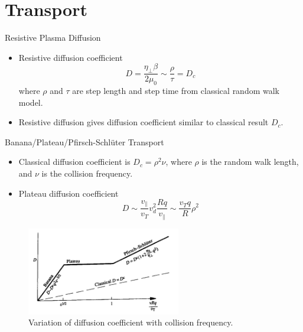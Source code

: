 \section{Transport}
\begin{frame} {Resistive Plasma Diffusion}
  \begin{itemize}
    \item Resistive diffusion coefficient
          \[ D = \frac{\eta_\perp\beta}{2\mu_0} \sim \frac{\rho}{\tau} = D_c \]
          where $\rho$ and $\tau$ are step length and step time from classical random walk model.
    \item Resistive diffusion gives diffusion coefficient similar to classical result $D_c$.
  \end{itemize}
\end{frame}

\begin{frame} {Banana/Plateau/Pfirsch-Schl\"{u}ter Transport}
  \begin{itemize}
    \item Classical diffusion coefficient is $ D_{c} = \rho^{2}\nu $, where $\rho$ is the random walk length, and $\nu$ is the collision frequency.
    \item Plateau diffusion coefficient
          \[ D \sim \frac{v_{\parallel}}{v_{T}}v_{d}^{2} \frac{Rq}{v_{\parallel}} \sim \frac{v_{T}q}{R}\rho^{2} \]
  \end{itemize}

  \begin{figure}
    \centering
    \includegraphics[width=0.6\textwidth]{figures/plateau-transport.png}
    \caption{Variation of diffusion coefficient with collision frequency.}
    \label{fig:plateau-transport}
  \end{figure}
\end{frame}

